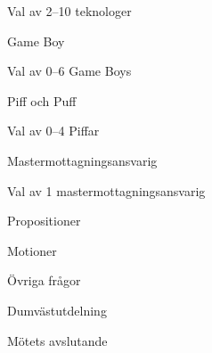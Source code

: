 \documentclass[prelim]{sektionsmote}
\begin{document}
\begin{ootd}
\begin{ootd}
\begin{ootd}
        \item Val av 2--10 teknologer
    \end{ootd}
    \item Game Boy
    \begin{ootd}
        \item Val av 0--6 Game Boys
    \end{ootd}
    \item Piff och Puff
    \begin{ootd}
        \item Val av 0--4 Piffar
    \end{ootd}
    \item Mastermottagningsansvarig
    \begin{ootd}
        \item Val av 1 mastermottagningsansvarig
    \end{ootd}
\end{ootd}

\item{Propositioner}

\item{Motioner}

\item{Övriga frågor}

\item{Dumvästutdelning}

\item{Mötets avslutande}
\end{ootd}

\begin{bilagor}
    
    

  

\end{bilagor}
\end{document}

